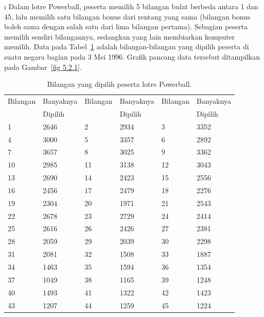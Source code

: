 \begin{LJSItem}
\i\label{exer 5.1.127} Dalam lotre Powerball,
peserta memilih 5 bilangan bulat berbeda antara 1 dan 45, lalu memilih satu bilangan bonus dari
rentang yang sama (bilangan bonus boleh sama dengan salah satu dari lima bilangan pertama).
Sebagian peserta memilih sendiri bilangannya, sedangkan yang lain membiarkan komputer
memilih. Data pada Tabel~\ref{table 5.10} adalah bilangan-bilangan yang dipilih peserta
di suatu negara bagian pada 3 Mei 1996. Grafik pancang data tersebut ditampilkan pada
Gambar~\ref{fig 5.2.1}.  
\par
{}

\begin{table}[h]
\centering
\begin{tabular}{llllll} Bilangan & Banyaknya & Bilangan & Banyaknya & Bilangan & Banyaknya\\
&Dipilih && Dipilih &&Dipilih\\
\hline
1&2646&
2&2934&
3&3352\\
4&3000&
5&3357&
6&2892\\
7&3657&
8&3025&
9&3362\\
10&2985&
11&3138&
12&3043\\
13&2690&
14&2423&
15&2556\\
16&2456&
17&2479&
18&2276\\
19&2304&
20&1971&
21&2543\\
22&2678&
23&2729&
24&2414\\
25&2616&
26&2426&
27&2381\\
28&2059&
29&2039&
30&2298\\
31&2081&
32&1508&
33&1887\\
34&1463&
35&1594&
36&1354\\
37&1049&
38&1165&
39&1248\\
40&1493&
41&1322&
42&1423\\
43&1207&
44&1259&
45&1224\\
\end{tabular}
\caption{Bilangan yang dipilih peserta lotre Powerball.}
\label{table 5.10}
\end{table}


\end{LJSItem}

